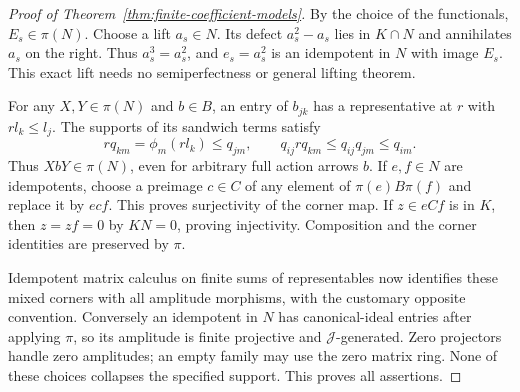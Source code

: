 \begin{proof}[Proof of Theorem~\ref{thm:finite-coefficient-models}]
By the choice of the functionals, $E_s\in\pi(N)$. Choose a lift
$a_s\in N$. Its defect $a_s^2-a_s$ lies in $K\cap N$ and
annihilates $a_s$ on the right. Thus $a_s^3=a_s^2$, and
$e_s=a_s^2$ is an idempotent in $N$ with image $E_s$. This
exact lift needs no semiperfectness or general lifting theorem.

For any $X,Y\in\pi(N)$ and $b\in B$, an entry of $b_{jk}$
has a representative at $r$ with $rl_k\leq l_j$. The supports
of its sandwich terms satisfy
\[
 rq_{km}=\phi_m(rl_k)\leq q_{jm},\qquad
 q_{ij}rq_{km}\leq q_{ij}q_{jm}\leq q_{im}.
\]
Thus $XbY\in\pi(N)$, even for arbitrary full action arrows
$b$. If $e,f\in N$ are idempotents, choose a preimage $c\in C$
of any element of $\pi(e)B\pi(f)$ and replace it by $ecf$.
This proves surjectivity of the corner map. If $z\in eCf$ is
in $K$, then $z=zf=0$ by $KN=0$, proving injectivity.
Composition and the corner identities are preserved by $\pi$.

Idempotent matrix calculus on finite sums of representables now
identifies these mixed corners with all amplitude morphisms,
with the customary opposite convention. Conversely an idempotent
in $N$ has canonical-ideal entries after applying $\pi$, so its
amplitude is finite projective and $\mathcal J$-generated. Zero
projectors handle zero amplitudes; an empty family may use the
zero matrix ring. None of these choices collapses the specified
support. This proves all assertions.
\end{proof}

